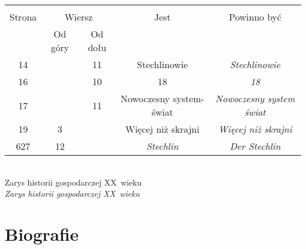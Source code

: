 \documentclass[a4paper,11pt]{article}
\begin{document}
\begin{center}

  \begin{tabular}{|c|c|c|c|c|}
    \hline
    & \multicolumn{2}{c|}{} & & \\
    Strona & \multicolumn{2}{c|}{Wiersz} & Jest
                              & Powinno być \\ \cline{2-3}
    & Od góry & Od dołu & & \\
    \hline
    14  & & 11 & Stechlinowie & \textit{Stechlinowie} \\
    16  & & 10 & 18 & \textit{18} \\
    17  & & 11 & Nowoczesny system-świat
           & \textit{Nowoczesny system świat} \\
    19  &  3 & & Więcej niż skrajni & \textit{Więcej niż skrajni} \\
    627 & 12 & & \textit{Stechlin} & \textit{Der Stechlin} \\
    \hline
  \end{tabular}

\end{center}

\noindent
{} \\
\Jest  Zarys historii gospodarczej XX~wieku \\
\Powin \textit{Zarys historii gospodarczej XX~wieku}


\vspace{\spaceTwo}










\newpage

\section{Biografie}

\vspace{\spaceTwo}



\end{document}
